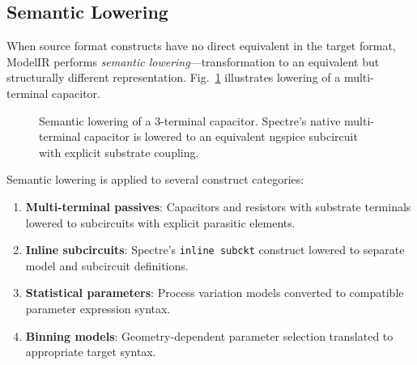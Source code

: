 \documentclass[conference]{IEEEtran}
\begin{document}
\subsection{Semantic Lowering}
\label{sec:semantic_lowering}

When source format constructs have no direct equivalent in the target format, ModelIR performs \textit{semantic lowering}---transformation to an equivalent but structurally different representation. Fig.~\ref{fig:lowering} illustrates lowering of a multi-terminal capacitor.

\begin{figure}[!t]
\centering
{}
\caption{Semantic lowering of a 3-terminal capacitor. Spectre's native multi-terminal capacitor is lowered to an equivalent ngspice subcircuit with explicit substrate coupling.}
\label{fig:lowering}
\end{figure}

Semantic lowering is applied to several construct categories:

\begin{enumerate}
    \item \textbf{Multi-terminal passives}: Capacitors and resistors with substrate terminals lowered to subcircuits with explicit parasitic elements.
    \item \textbf{Inline subcircuits}: Spectre's \texttt{inline subckt} construct lowered to separate model and subcircuit definitions.
    \item \textbf{Statistical parameters}: Process variation models converted to compatible parameter expression syntax.
    \item \textbf{Binning models}: Geometry-dependent parameter selection translated to appropriate target syntax.
\end{enumerate}
\end{document}
